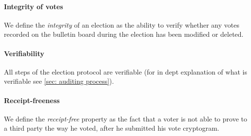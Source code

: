 \paragraph{Integrity of votes}
We define the \textit{integrity} of an election as the ability to verify whether any votes recorded on the bulletin board during the election has been modified or deleted.

\paragraph{Verifiability}
All steps of the election protocol are verifiable (for in dept explanation of what is verifiable see \cref{sec: auditing process}).

\paragraph{Receipt-freeness}

We define the \textit{receipt-free} property as the fact that a voter is not able to prove to a third party the way he voted, after he submitted his vote cryptogram.
